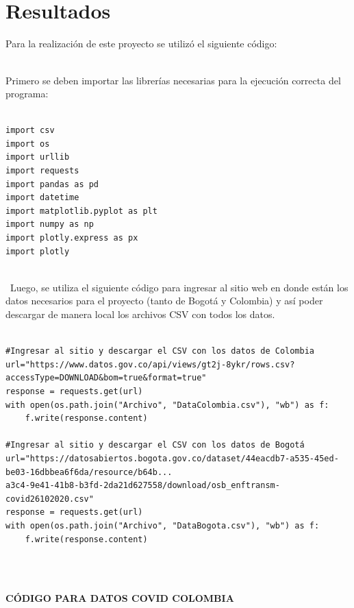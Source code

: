\documentclass[conference,compsoc,onecolumn]{IEEEtran}
\begin{document}
\\\
\section{Resultados}
\label{sec:results}

Para la realización de este proyecto se utilizó el siguiente código:
\\\

Primero se deben importar las librerías necesarias para la ejecución correcta del programa:
\\\

\begin{lstlisting}
import csv
import os
import urllib
import requests
import pandas as pd
import datetime
import matplotlib.pyplot as plt
import numpy as np
import plotly.express as px
import plotly

\end{lstlisting}
\\\
Luego, se utiliza el siguiente código para ingresar al sitio web en donde están los datos necesarios para el proyecto (tanto de Bogotá y Colombia) y así poder descargar de manera local los archivos CSV con todos los datos.\\\

\begin{lstlisting}
#Ingresar al sitio y descargar el CSV con los datos de Colombia
url="https://www.datos.gov.co/api/views/gt2j-8ykr/rows.csv?accessType=DOWNLOAD&bom=true&format=true"
response = requests.get(url)
with open(os.path.join("Archivo", "DataColombia.csv"), "wb") as f:
    f.write(response.content)

#Ingresar al sitio y descargar el CSV con los datos de Bogotá
url="https://datosabiertos.bogota.gov.co/dataset/44eacdb7-a535-45ed-be03-16dbbea6f6da/resource/b64b...
a3c4-9e41-41b8-b3fd-2da21d627558/download/osb_enftransm-covid26102020.csv"
response = requests.get(url)
with open(os.path.join("Archivo", "DataBogota.csv"), "wb") as f:
    f.write(response.content)

\end{lstlisting}
\\\

\textbf{CÓDIGO PARA DATOS COVID COLOMBIA}
\\\
\end{document}
